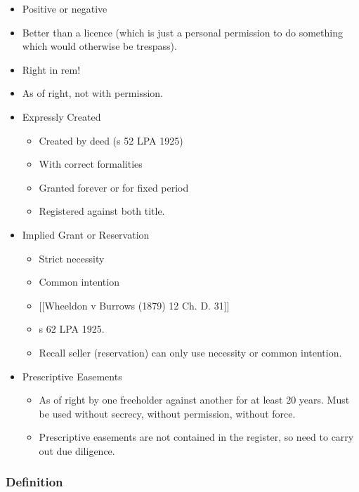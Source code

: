 \documentclass[
]{article}
\providecommand{\tightlist}{%
  \setlength{\itemsep}{0pt}\setlength{\parskip}{0pt}}
\begin{document}
\begin{itemize}
\tightlist
\item
  Positive or negative
\item
  Better than a licence (which is just a personal permission to do
  something which would otherwise be trespass).
\item
  Right in rem!
\item
  As of right, not with permission.
\item
  Expressly Created

  \begin{itemize}
  \tightlist
  \item
    Created by deed (s 52 LPA 1925)
  \item
    With correct formalities
  \item
    Granted forever or for fixed period
  \item
    Registered against both title.
  \end{itemize}
\item
  Implied Grant or Reservation

  \begin{itemize}
  \tightlist
  \item
    Strict necessity
  \item
    Common intention
  \item
    {[}{[}Wheeldon v Burrows (1879) 12 Ch. D. 31{]}{]}
  \item
    s 62 LPA 1925.
  \item
    Recall seller (reservation) can only use necessity or common
    intention.
  \end{itemize}
\item
  Prescriptive Easements

  \begin{itemize}
  \tightlist
  \item
    As of right by one freeholder against another for at least 20 years.
    Must be used without secrecy, without permission, without force.
  \item
    Prescriptive easements are not contained in the register, so need to
    carry out due diligence.
  \end{itemize}
\end{itemize}

\hypertarget{definition}{%
\subsubsection{Definition}\label{definition}}
\end{document}
